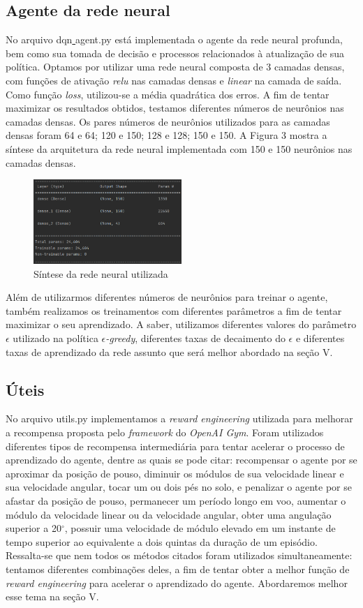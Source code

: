 \documentclass[letterpaper, 10 pt, conference]{ieeeconf}  %
\begin{document}
\subsection{Agente da rede neural}
 No arquivo dqn\underline{ }agent.py está implementada o agente da rede neural profunda, bem como sua tomada de decisão e processos relacionados à atualização de sua política. Optamos por utilizar uma rede neural composta de 3 camadas densas, com funções de ativação \emph{relu} nas camadas densas e \emph{linear} na camada de saída. Como função \emph{loss}, utilizou-se a média quadrática dos erros. A fim de tentar maximizar os resultados obtidos, testamos diferentes números de neurônios nas camadas densas. Os pares números de neurônios utilizados para as camadas densas foram 64 e 64; 120 e 150; 128 e 128; 150 e 150. A Figura 3 mostra a síntese da arquitetura da rede neural implementada com 150 e 150 neurônios nas camadas densas.
\begin{figure}[H]
\centering
\includegraphics[width=0.5\textwidth]{rede.png}
\caption{Síntese da rede neural utilizada}
\label{fig:comparacao}
\end{figure}
Além de utilizarmos diferentes números de neurônios para treinar o agente, também realizamos os treinamentos com diferentes parâmetros a fim de tentar maximizar o seu aprendizado. A saber, utilizamos diferentes valores do parâmetro \(\epsilon\) utilizado na política \(\epsilon\)\emph{-greedy}, diferentes taxas de decaimento do \(\epsilon\) e diferentes taxas de aprendizado da rede assunto que será melhor abordado na seção V. 
 
\subsection{Úteis}
No arquivo utils.py implementamos a \emph{reward engineering} utilizada para melhorar a recompensa proposta pelo \emph{framework} do \emph{OpenAI Gym}. Foram utilizados diferentes tipos de recompensa intermediária para tentar acelerar o processo de aprendizado do agente, dentre as quais se pode citar: recompensar o agente por se aproximar da posição de pouso, diminuir os módulos de sua velocidade linear e sua velocidade angular, tocar um ou dois pés no solo, e penalizar o agente por se afastar da posição de pouso, permanecer um período longo em voo, aumentar o módulo da velocidade linear ou da velocidade angular, obter uma angulação superior a 20$^{\circ}$, possuir uma velocidade de módulo elevado em um instante de tempo superior ao equivalente a dois quintas da duração de um episódio. Ressalta-se que nem todos os métodos citados foram utilizados simultaneamente: tentamos diferentes combinações deles, a fim de tentar obter a melhor função de \emph{reward engineering} para acelerar o aprendizado do agente. Abordaremos melhor esse tema na seção V.
\end{document}
